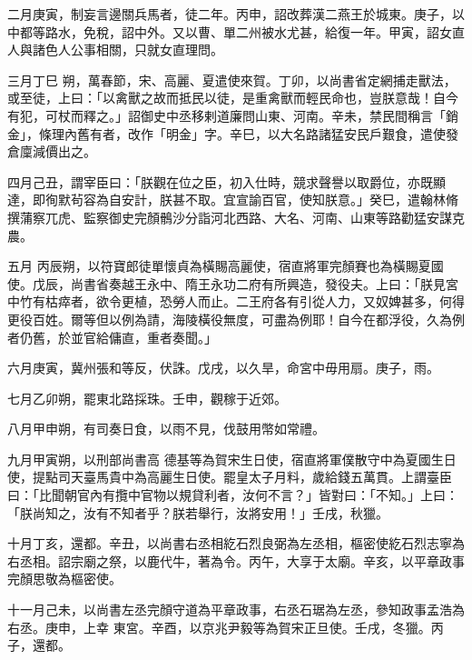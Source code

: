 \begin{pinyinscope}
 二月庚寅，制妄言邊關兵馬者，徒二年。丙申，詔改葬漢二燕王於城東。庚子，以中都等路水，免稅，詔中外。又以曹、單二州被水尤甚，給復一年。甲寅，詔女直人與諸色人公事相關，只就女直理問。



 三月丁巳
 朔，萬春節，宋、高麗、夏遣使來賀。丁卯，以尚書省定網捕走獸法，或至徒，上曰：「以禽獸之故而抵民以徒，是重禽獸而輕民命也，豈朕意哉！自今有犯，可杖而釋之。」詔御史中丞移剌道廉問山東、河南。辛未，禁民間稱言「銷金」，條理內舊有者，改作「明金」字。辛巳，以大名路諸猛安民戶艱食，遣使發倉廩減價出之。



 四月己丑，謂宰臣曰：「朕觀在位之臣，初入仕時，競求聲譽以取爵位，亦既顯達，即徇默茍容為自安計，朕甚不取。宜宣諭百官，使知朕意。」癸巳，遣翰林脩撰蒲察兀虎、監察御史完顏鶻沙分詣河北西路、大名、河南、山東等路勸猛安謀克農。



 五月
 丙辰朔，以符寶郎徒單懷貞為橫賜高麗使，宿直將軍完顏賽也為橫賜夏國使。戊辰，尚書省奏越王永中、隋王永功二府有所興造，發役夫。上曰：「朕見宮中竹有枯瘁者，欲令更植，恐勞人而止。二王府各有引從人力，又奴婢甚多，何得更役百姓。爾等但以例為請，海陵橫役無度，可盡為例耶！自今在都浮役，久為例者仍舊，於並官給傭直，重者奏聞。」



 六月庚寅，冀州張和等反，伏誅。戊戌，以久旱，命宮中毋用扇。庚子，雨。



 七月乙卯朔，罷東北路採珠。壬申，觀稼于近郊。



 八月甲申朔，有司奏日食，以雨不見，伐鼓用幣如常禮。



 九月甲寅朔，以刑部尚書高
 德基等為賀宋生日使，宿直將軍僕散守中為夏國生日使，提點司天臺馬貴中為高麗生日使。罷皇太子月料，歲給錢五萬貫。上謂臺臣曰：「比聞朝官內有攬中官物以規貸利者，汝何不言？」皆對曰：「不知。」上曰：「朕尚知之，汝有不知者乎？朕若舉行，汝將安用！」壬戌，秋獵。



 十月丁亥，還都。辛丑，以尚書右丞相紇石烈良弼為左丞相，樞密使紇石烈志寧為右丞相。詔宗廟之祭，以鹿代牛，著為令。丙午，大享于太廟。辛亥，以平章政事完顏思敬為樞密使。



 十一月己未，以尚書左丞完顏守道為平章政事，右丞石琚為左丞，參知政事孟浩為右丞。庚申，上幸
 東宮。辛酉，以京兆尹毅等為賀宋正旦使。壬戌，冬獵。丙子，還都。




\end{pinyinscope}

